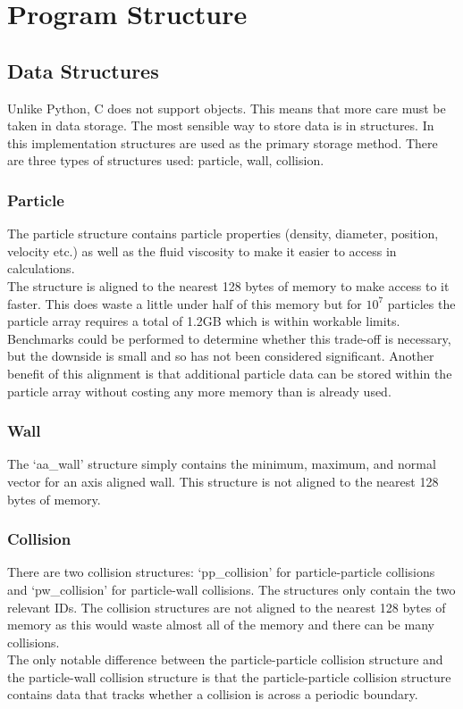 \documentclass[10pt,a4paper,titlepage]{report}
\begin{document}
\section{Program Structure}
\subsection{Data Structures}
Unlike Python, C does not support objects. This means that more care must be taken in data storage. The most sensible way to store data is in structures. In this implementation structures are used as the primary storage method. There are three types of structures used: particle, wall, collision.
\subsubsection{Particle}
The particle structure contains particle properties (density, diameter, position, velocity etc.) as well as the fluid viscosity to make it easier to access in calculations.
\\The structure is aligned to the nearest 128 bytes of memory to make access to it faster. This does waste a little under half of this memory but for $10^7$ particles the particle array requires a total of 1.2GB which is within workable limits. Benchmarks could be performed to determine whether this trade-off is necessary, but the downside is small and so has not been considered significant. Another benefit of this alignment is that additional particle data can be stored within the particle array without costing any more memory than is already used.
\subsubsection{Wall}
The `aa\_wall' structure simply contains the minimum, maximum, and normal vector for an axis aligned wall. This structure is not aligned to the nearest 128 bytes of memory.
\subsubsection{Collision}
There are two collision structures: `pp\_collision' for particle-particle collisions and `pw\_collision' for particle-wall collisions. The structures only contain the two relevant IDs. The collision structures are not aligned to the nearest 128 bytes of memory as this would waste almost all of the memory and there can be many collisions.
\\The only notable difference between the particle-particle collision structure and the particle-wall collision structure is that the particle-particle collision structure contains data that tracks whether a collision is across a periodic boundary.
\end{document}
